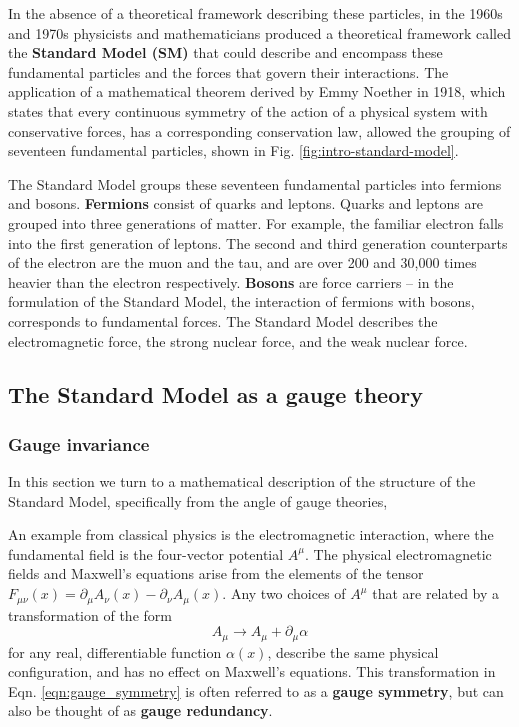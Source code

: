 \documentclass{article}
\begin{document}
In the absence of a theoretical framework describing these particles, in the 1960s and 1970s physicists and mathematicians produced a theoretical framework called the \textbf{Standard Model (SM)} that could describe and encompass these fundamental particles and the forces that govern their interactions. The application of a mathematical theorem derived by Emmy Noether in 1918, which states that every continuous symmetry of the action of a physical system with conservative forces, has a corresponding conservation law, allowed the grouping of seventeen fundamental particles, shown in Fig. \ref{fig:intro-standard-model}.

The Standard Model groups these seventeen fundamental particles into fermions and bosons. \textbf{Fermions} consist of quarks and leptons. Quarks and leptons are grouped into three generations of matter. For example, the familiar electron falls into the first generation of leptons. The second and third generation counterparts of the electron are the muon and the tau, and are over 200 and 30,000 times heavier than the electron respectively. \textbf{Bosons} are force carriers -- in the formulation of the Standard Model, the interaction of fermions with bosons, corresponds to fundamental forces. The Standard Model describes the electromagnetic force, the strong nuclear force, and the weak nuclear force.


\subsection{The Standard Model as a gauge theory}

\subsubsection{Gauge invariance}

In this section we turn to a mathematical description of the structure of the Standard Model, specifically from the angle of gauge theories,

An example from classical physics is the electromagnetic interaction, where the fundamental field is the four-vector potential $A^\mu$. The physical electromagnetic fields and Maxwell's equations arise from the elements of the tensor $F_{\mu\nu}(x) = \partial_\mu A_\nu (x) - \partial_\nu A_\mu (x)$. Any two choices of $A^\mu$ that are related by a transformation of the form \begin{equation} A_\mu \rightarrow A_\mu + \partial_\mu \alpha \label{eqn:gauge_symmetry}\end{equation} for any real, differentiable function $\alpha(x)$, describe the same physical configuration, and has no effect on Maxwell's equations. This transformation in Eqn. \ref{eqn:gauge_symmetry} is often referred to as a \textbf{gauge symmetry}, but can also be thought of as \textbf{gauge redundancy}.
\end{document}
